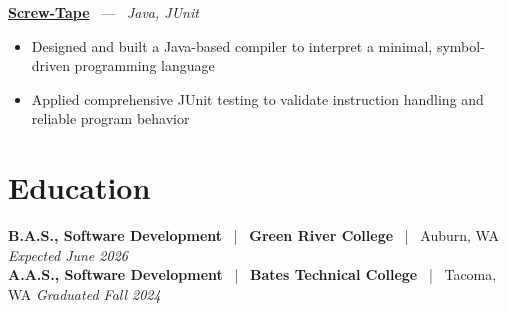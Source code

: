 \documentclass[10pt, letterpaper]{article}
\newcommand{\jobhead}[4]{%
  \vspace{5pt}%
  {\bfseries\color{dark}#1}%
  ~{\color{light}|}~%
  {\bfseries\color{navy}#2}%
  ~{\color{light}|}~%
  {\color{light}#3}%
  \hfill{\color{light}\small\textit{#4}}\\[-2pt]%
}
\newcommand{\projhead}[3]{%
  \vspace{5pt}%
  {\bfseries\color{dark}\href{#2}{#1}}%
  ~{\color{light}---}~%
  {\color{light}\small\textit{#3}}\\[-2pt]%
}
\begin{document}
\projhead{Screw-Tape}{https://github.com/timmyd4/screwtape}{Java, JUnit}
\begin{itemize}
  \item Designed and built a Java-based compiler to interpret a minimal, symbol-driven programming language
  \item Applied comprehensive JUnit testing to validate instruction handling and reliable program behavior
\end{itemize}

\section{Education}

\jobhead{B.A.S., Software Development}{Green River College}{Auburn, WA}{Expected June 2026}
\jobhead{A.A.S., Software Development}{Bates Technical College}{Tacoma, WA}{Graduated Fall 2024}
\end{document}
